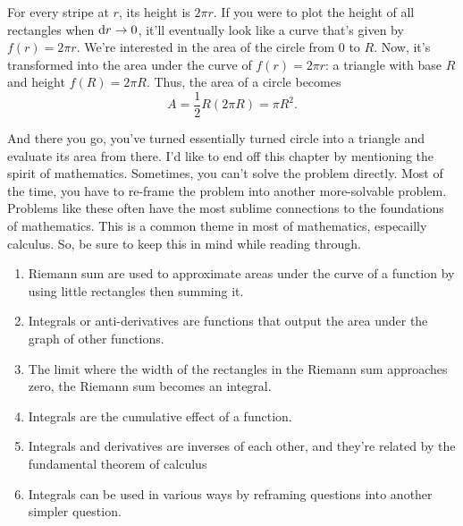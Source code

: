 For every stripe at $r$, its height is $2\pi r$. If you were to plot the height of all rectangles when $\odif{r} \appr 0$, it'll eventually look like a curve that's given by $f(r) = 2\pi r$. We're interested in the area of the circle from $0$ to $R$. Now, it's transformed into the area under the curve of $f(r) = 2\pi r$: a triangle with base $R$ and height $f(R) = 2\pi R$. Thus, the area of a circle becomes
\begin{equation*}
    A = \frac{1}{2}R(2\pi R) = \pi R^2.
\end{equation*}

And there you go, you've turned essentially turned circle into a triangle and evaluate its area from there. I'd like to end off this chapter by mentioning the spirit of mathematics. Sometimes, you can't solve the problem directly. Most of the time, you have to re-frame the problem into another more-solvable problem. Problems like these often have the most sublime connections to the foundations of mathematics. This is a common theme in most of mathematics, especailly calculus. So, be sure to keep this in mind while reading through.

\conclusion

\begin{enumerate}
    \item Riemann sum are used to approximate areas under the curve of a function by using little rectangles then summing it.
    \item Integrals or anti-derivatives are functions that output the area under the graph of other functions.
    \item The limit where the width of the rectangles in the Riemann sum approaches zero, the Riemann sum becomes an integral.
    \item Integrals are the cumulative effect of a function.
    \item Integrals and derivatives are inverses of each other, and they're related by the fundamental theorem of calculus
    \item Integrals can be used in various ways by reframing questions into another simpler question.
\end{enumerate}